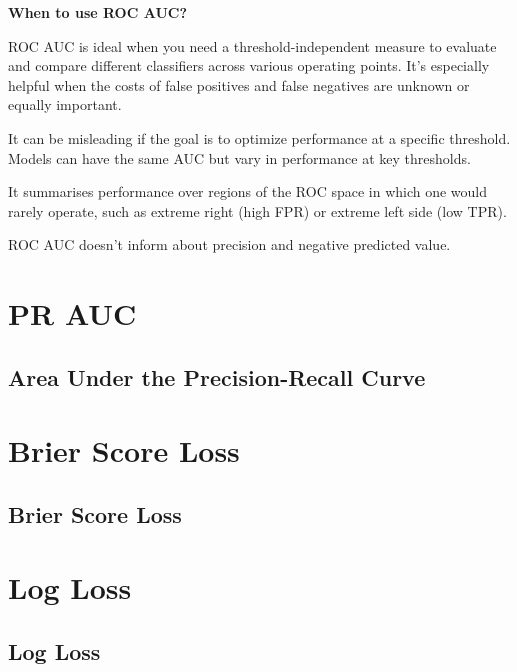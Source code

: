 \textbf{When to use ROC AUC?}

ROC AUC is ideal when you need a threshold-independent measure to evaluate and compare different classifiers across various operating points. It's especially helpful when the costs of
false positives and false negatives are unknown or equally important.

{
\item It can be misleading if the goal is to optimize performance at a specific threshold. Models can have the same AUC but vary in performance at key thresholds.
\item It summarises performance over regions of the ROC space in which one would rarely operate, such as extreme right (high FPR) or extreme left side (low TPR).
\item ROC AUC doesn't inform about precision and negative predicted value.
}

\clearpage
\thispagestyle{classificationstyle}
\section{PR AUC}
\subsection{Area Under the Precision-Recall Curve}

\clearpage
\thispagestyle{classificationstyle}
\section{Brier Score Loss}
\subsection{Brier Score Loss}

\clearpage
\thispagestyle{classificationstyle}
\section{Log Loss}
\subsection{Log Loss}

